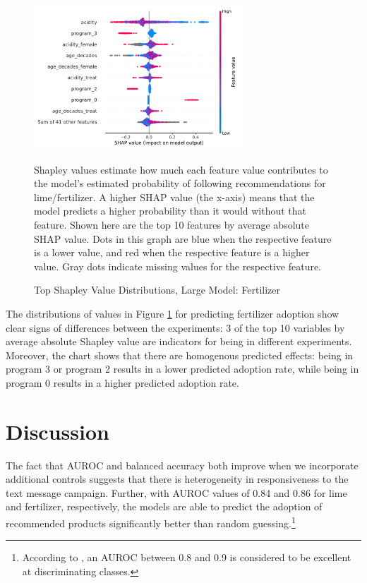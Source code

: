 \documentclass[12pt]{article}
\begin{document}
\begin{figure}[H]
    \centering
    \caption{Top Shapley Value Distributions, Large Model: Fertilizer}
    \includegraphics[width=0.7\textwidth]{../output/shap_beeswarm_fert.pdf}
    \begin{minipage}{0.7\textwidth}
    \tiny
    Shapley values estimate how much each feature value contributes to the model's estimated probability of following recommendations for lime/fertilizer. A higher SHAP value (the x-axis) means that the model predicts a higher probability than it would without that feature. Shown here are the top 10 features by average absolute SHAP value. Dots in this graph are blue when the respective feature is a lower value, and red when the respective feature is a higher value. Gray dots indicate missing values for the respective feature.
    \end{minipage}
    \label{fig:shap_fert}
\end{figure}

The distributions of values in Figure \ref{fig:shap_fert} for predicting fertilizer adoption show clear signs of differences between the experiments: 3 of the top 10 variables by average absolute Shapley value are indicators for being in different experiments. Moreover, the chart shows that there are homogenous predicted effects: being in program 3 or program 2 results in a lower predicted adoption rate, while being in program 0 results in a higher predicted adoption rate.

\section{Discussion}
\label{section:discussion}

The fact that AUROC and balanced accuracy both improve when we incorporate additional controls suggests that there is heterogeneity in responsiveness to the text message campaign. Further, with AUROC values of 0.84 and 0.86 for lime and fertilizer, respectively, the models are able to predict the adoption of recommended products significantly better than random guessing.\footnote{According to \textcite{mandrekar_receiver_2010}, an AUROC between 0.8 and 0.9 is considered to be excellent at discriminating classes.}
\end{document}
